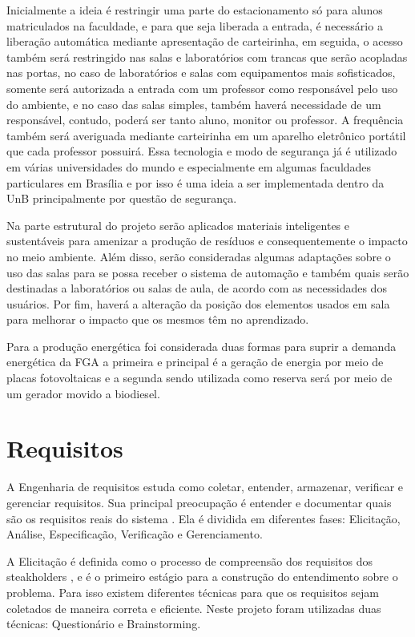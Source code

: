 Inicialmente a ideia é restringir uma parte do estacionamento só para alunos matriculados na faculdade, e para que seja liberada a entrada, é necessário a liberação automática mediante apresentação de carteirinha, em seguida, o acesso também será restringido nas salas e laboratórios com trancas que serão acopladas nas portas, no caso de laboratórios e salas com equipamentos mais sofisticados, somente será autorizada a entrada com um professor como responsável pelo uso do ambiente, e no caso das salas simples, também haverá necessidade de um responsável, contudo, poderá ser tanto aluno, monitor ou professor. A frequência também será averiguada mediante carteirinha em um aparelho eletrônico portátil que cada professor possuirá. Essa tecnologia e modo de segurança já é utilizado em várias universidades do mundo e especialmente em algumas faculdades particulares em Brasília e por isso é uma ideia a ser implementada dentro da UnB principalmente por questão de segurança.

Na parte estrutural do projeto serão aplicados materiais inteligentes e sustentáveis para amenizar a produção de resíduos e consequentemente o impacto no meio ambiente. Além disso, serão consideradas algumas adaptações sobre o uso das salas para se possa receber o sistema de automação e também quais serão destinadas a laboratórios ou salas de aula, de acordo com as necessidades dos usuários. Por fim, haverá a alteração da posição dos elementos usados em sala para melhorar o impacto que os mesmos têm no aprendizado.

Para a produção energética foi considerada duas formas para suprir a demanda energética da FGA a primeira e principal é a geração de energia por meio de placas fotovoltaicas e a segunda sendo utilizada como reserva será por meio de um gerador movido a biodiesel.

\chapter{Requisitos\label{ch:requisitos}}
A Engenharia de requisitos estuda como coletar, entender, armazenar, verificar e gerenciar requisitos. Sua principal preocupação é entender e documentar quais são os requisitos reais do sistema \cite{belgamo2000}. Ela é dividida em diferentes fases: Elicitação, Análise, Especificação, Verificação e Gerenciamento.

A Elicitação é definida como o processo de  compreensão dos requisitos dos steakholders \cite{yousuf2015}, e é o primeiro estágio para a construção do entendimento sobre o problema. Para isso existem diferentes técnicas para que os requisitos sejam coletados de maneira correta e eficiente. Neste projeto foram utilizadas duas técnicas:
Questionário e Brainstorming.

